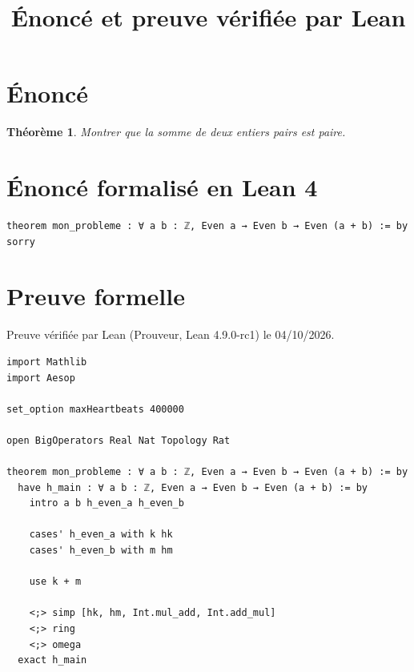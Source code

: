 \documentclass[11pt]{article}
\title{Énoncé et preuve vérifiée par Lean}
\author{}
\date{}
\theoremstyle{plain}
\newtheorem{theorem}{Théorème}
\begin{document}
\maketitle

\section*{Énoncé}
\begin{theorem}
Montrer que la somme de deux entiers pairs est paire.
\end{theorem}

\section*{Énoncé formalisé en Lean 4}
\begin{Verbatim}[breaklines=true,frame=single,fontsize=\small,rulecolor=\color{black!25}]
theorem mon_probleme : ∀ a b : ℤ, Even a → Even b → Even (a + b) := by sorry
\end{Verbatim}

\section*{Preuve formelle}
Preuve vérifiée par Lean (Prouveur, Lean 4.9.0-rc1) le 04/10/2026.
\begin{Verbatim}[breaklines=true,frame=single,fontsize=\small,rulecolor=\color{black!25}]
import Mathlib
import Aesop

set_option maxHeartbeats 400000

open BigOperators Real Nat Topology Rat

theorem mon_probleme : ∀ a b : ℤ, Even a → Even b → Even (a + b) := by
  have h_main : ∀ a b : ℤ, Even a → Even b → Even (a + b) := by
    intro a b h_even_a h_even_b
    
    cases' h_even_a with k hk
    cases' h_even_b with m hm
    
    use k + m
    
    <;> simp [hk, hm, Int.mul_add, Int.add_mul]
    <;> ring
    <;> omega
  exact h_main
\end{Verbatim}
\end{document}
